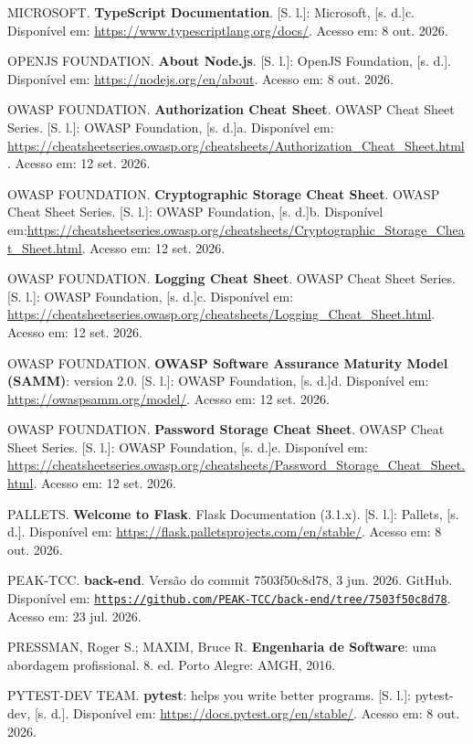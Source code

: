\documentclass[12pt,a4paper,oneside]{report}
\newcommand{\tituloref}[1]{\textbf{#1}}
\begin{document}
MICROSOFT. \tituloref{TypeScript Documentation}. [S. l.]: Microsoft, [s. d.]c. Disponível em: \url{https://www.typescriptlang.org/docs/}. Acesso em: 8 out. 2026.

OPENJS FOUNDATION. \tituloref{About Node.js}. [S. l.]: OpenJS Foundation, [s. d.]. Disponível em: \url{https://nodejs.org/en/about}. Acesso em: 8 out. 2026.

OWASP FOUNDATION. \tituloref{Authorization Cheat Sheet}. OWASP Cheat Sheet Series. [S. l.]: OWASP Foundation, [s. d.]a. Disponível em: \url{https://cheatsheetseries.owasp.org/cheatsheets/Authorization_Cheat_Sheet.html}. Acesso em: 12 set. 2026.

OWASP FOUNDATION. \tituloref{Cryptographic Storage Cheat Sheet}. OWASP Cheat Sheet Series. [S. l.]: OWASP Foundation, [s. d.]b. Disponível em:\linebreak \url{https://cheatsheetseries.owasp.org/cheatsheets/Cryptographic_Storage_Cheat_Sheet.html}. Acesso em: 12 set. 2026.

OWASP FOUNDATION. \tituloref{Logging Cheat Sheet}. OWASP Cheat Sheet Series. [S. l.]: OWASP Foundation, [s. d.]c. Disponível em: \url{https://cheatsheetseries.owasp.org/cheatsheets/Logging_Cheat_Sheet.html}. Acesso em: 12 set. 2026.

OWASP FOUNDATION. \tituloref{OWASP Software Assurance Maturity Model (SAMM)}: version 2.0. [S. l.]: OWASP Foundation, [s. d.]d. Disponível em: \url{https://owaspsamm.org/model/}. Acesso em: 12 set. 2026.

OWASP FOUNDATION. \tituloref{Password Storage Cheat Sheet}. OWASP Cheat Sheet Series. [S. l.]: OWASP Foundation, [s. d.]e. Disponível em: \url{https://cheatsheetseries.owasp.org/cheatsheets/Password_Storage_Cheat_Sheet.html}. Acesso em: 12 set. 2026.

PALLETS. \tituloref{Welcome to Flask}. Flask Documentation (3.1.x). [S. l.]: Pallets, [s. d.]. Disponível em: \url{https://flask.palletsprojects.com/en/stable/}. Acesso em: 8 out. 2026.

PEAK-TCC. \tituloref{back-end}. Versão do commit 7503f50c8d78, 3 jun. 2026. GitHub. Disponível em: \href{https://github.com/PEAK-TCC/back-end/tree/7503f50c8d785f1ef60a557a4cb780d004108f3a}{\nolinkurl{https://github.com/PEAK-TCC/back-end/tree/7503f50c8d78}}. Acesso em: 23 jul. 2026.

PRESSMAN, Roger S.; MAXIM, Bruce R. \tituloref{Engenharia de Software}: uma abordagem profissional. 8. ed. Porto Alegre: AMGH, 2016.

PYTEST-DEV TEAM. \tituloref{pytest}: helps you write better programs. [S. l.]: pytest-dev, [s. d.]. Disponível em: \url{https://docs.pytest.org/en/stable/}. Acesso em: 8 out. 2026.
\end{document}
